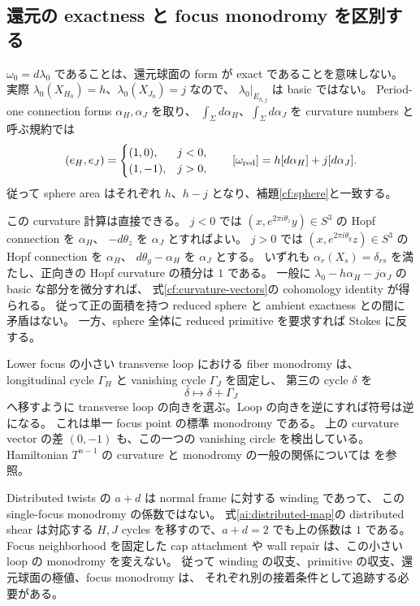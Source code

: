 \subsection{還元の exactness と focus monodromy を区別する}

$\omega_0=d\lambda_0$ であることは、還元球面の form が exact であることを意味しない。
実際 $\lambda_0(X_{H_0})=h$、$\lambda_0(X_{J_0})=j$ なので、
$\lambda_0|_{E_{h,j}}$ は basic ではない。
Period-one connection forms $\alpha_H,\alpha_J$ を取り、
$\int_{\Sigma}d\alpha_H$、$\int_{\Sigma}d\alpha_J$ を curvature numbers と呼ぶ規約では
\begin{equation}\label{cf:curvature-vectors}
 (e_H,e_J)=
 \begin{cases}(1,0),&j<0,\\(1,-1),&j>0,\end{cases}
 \qquad
 [\omega_{\rm red}]=h[d\alpha_H]+j[d\alpha_J].
\end{equation}
従って sphere area はそれぞれ $h$、$h-j$ となり、補題\ref{cf:sphere}と一致する。

この curvature 計算は直接できる。
$j<0$ では $(x,e^{2\pi i\theta_z}y)\in S^3$ の Hopf connection を $\alpha_H$、
$-d\theta_z$ を $\alpha_J$ とすればよい。
$j>0$ では $(x,e^{2\pi i\theta_y}z)\in S^3$ の Hopf connection を $\alpha_H$、
$d\theta_y-\alpha_H$ を $\alpha_J$ とする。
いずれも $\alpha_r(X_s)=\delta_{rs}$ を満たし、正向きの Hopf curvature の積分は $1$ である。
一般に $\lambda_0-h\alpha_H-j\alpha_J$ の basic な部分を微分すれば、
式\eqref{cf:curvature-vectors}の cohomology identity が得られる。
従って正の面積を持つ reduced sphere と ambient exactness との間に矛盾はない。
一方、sphere 全体に reduced primitive を要求すれば Stokes に反する。

Lower focus の小さい transverse loop における fiber monodromy は、
longitudinal cycle $\Gamma_H$ と vanishing cycle $\Gamma_J$ を固定し、
第三の cycle $\delta$ を
\[
 \delta\longmapsto\delta+\Gamma_J
\]
へ移すように transverse loop の向きを選ぶ。Loop の向きを逆にすれば符号は逆になる。
これは単一 focus point の標準 monodromy である\cite[\S3, Lemma 1]{zung-focus-cf}。
上の curvature vector の差 $(0,-1)$ も、この一つの vanishing circle を検出している。
Hamiltonian $T^{n-1}$ の curvature と monodromy の一般の関係については
\cite[Theorems 3.2 and 3.15]{efstathiou-martynchuk-cf} を参照。

Distributed twists の $a+d$ は normal frame に対する winding であって、
この single-focus monodromy の係数ではない。
式\eqref{ai:distributed-map}の distributed shear は対応する $H,J$ cycles を移すので、$a+d=2$ でも上の係数は $1$ である。
Focus neighborhood を固定した cap attachment や wall repair は、この小さい loop の monodromy を変えない。
従って winding の収支、primitive の収支、還元球面の極値、focus monodromy は、
それぞれ別の接着条件として追跡する必要がある。

